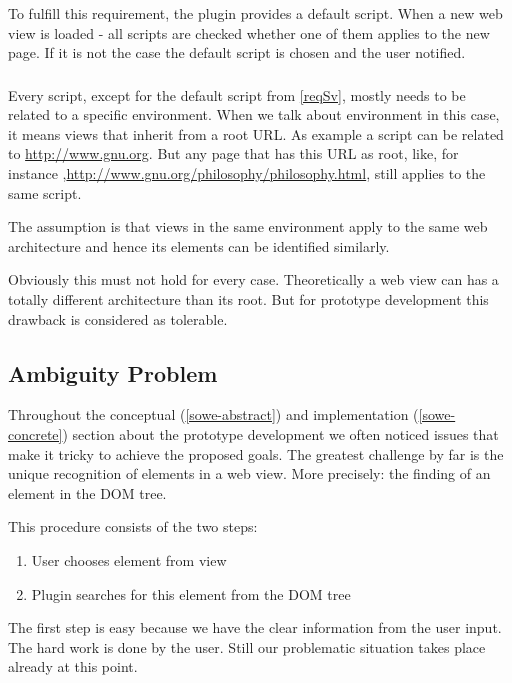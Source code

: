To fulfill this requirement, the plugin provides a default script. When a new web view is loaded - all scripts are checked whether one of them applies to the new page. If it is not the case the default script is chosen and the user notified. 

\subsubsection[Relation to URL set]{\reqSvi}

Every script, except for the default script from \ref{reqSv}, mostly needs to be related to a specific environment. When we talk about environment in this case, it means views that inherit from a root URL. As example a script can be related to \url{http://www.gnu.org}. But any page that has this URL as root, like, for instance ,\url{http://www.gnu.org/philosophy/philosophy.html}, still applies to the same script. 

The assumption is that views in the same environment apply to the same web architecture and hence its elements can be identified similarly. 

Obviously this must not hold for every case. Theoretically a web view can has a totally different architecture than its root. But for prototype development this drawback is considered as tolerable. 

\newpage
\subsection{Ambiguity Problem}\label{ambiguity-problem}

Throughout the conceptual (\ref{sowe-abstract}) and implementation (\ref{sowe-concrete}) section about the prototype development we often noticed issues that make it tricky to achieve the proposed goals. The greatest challenge by far is the unique recognition of elements in a web view. More precisely: the finding of an element in the DOM tree. 

This procedure consists of the two steps:
\begin{enumerate}
	\item User chooses element from view
	\item Plugin searches for this element from the DOM tree
\end{enumerate}

The first step is easy because we have the clear information from the user input. The hard work is done by the user. Still our problematic situation takes place already at this point. 

